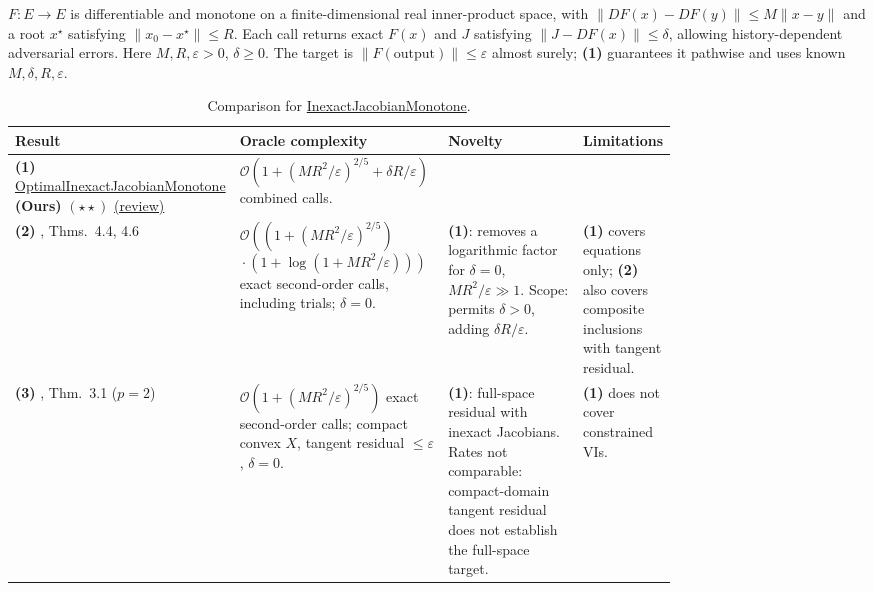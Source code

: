 \begin{table}[tp]
\centering
\caption{Comparison for \href{https://github.com/k3nfalt/longtails/blob/main/LongTails/Setups/InexactJacobianMonotone.lean}{InexactJacobianMonotone}.}\label{tab:InexactJacobianMonotone}
\parbox{\linewidth}{\footnotesize $F:E\to E$ is differentiable and monotone on a finite-dimensional real inner-product space, with $\|DF(x)-DF(y)\|\le M\|x-y\|$ and a root $x^\star$ satisfying $\|x_0-x^\star\|\le R$. Each call returns exact $F(x)$ and $J$ satisfying $\|J-DF(x)\|\le\delta$, allowing history-dependent adversarial errors. Here $M,R,\varepsilon>0$, $\delta\ge0$. The target is $\|F(\mathrm{output})\|\le\varepsilon$ almost surely; \textbf{(1)} guarantees it pathwise and uses known $M,\delta,R,\varepsilon$.}\par\smallskip
\begin{threeparttable}
\footnotesize
\setlength{\tabcolsep}{4pt}\renewcommand{\arraystretch}{1.25}
\begin{tabularx}{\linewidth}{@{}>{\raggedright\arraybackslash}p{0.20\linewidth}>{\raggedright\arraybackslash}p{0.32\linewidth}>{\raggedright\arraybackslash}p{0.25\linewidth}>{\raggedright\arraybackslash}X@{}}
\toprule
\textbf{Result} & \textbf{Oracle complexity} & \textbf{Novelty} & \textbf{Limitations} \\
\midrule
\textbf{(1)} \href{https://github.com/k3nfalt/longtails/blob/main/LongTails/Theorems/OptimalInexactJacobianMonotone.lean}{Optimal\allowbreak Inexact\allowbreak Jacobian\allowbreak Monotone} \textbf{(Ours)} $(\star\star)$ \href{https://github.com/k3nfalt/longtails/blob/main/scripts/reviews/OptimalInexactJacobianMonotone.md}{(review)} & $\mathcal{O}(1+(MR^2/\varepsilon)^{2/5}+\delta R/\varepsilon)$ combined calls. & & \\
\midrule[1.2pt]
\textbf{(2)} \citep{uljmJiangYoon2026v1}, Thms.~4.4, 4.6 & $\mathcal{O}\!\left((1+(MR^2/\varepsilon)^{2/5})\right.$\newline $\left.{}\cdot(1+\log(1+MR^2/\varepsilon))\right)$ exact second-order calls, including trials; $\delta=0$. & \textbf{(1)}: removes a logarithmic factor for $\delta=0$, $MR^2/\varepsilon\gg1$. Scope: permits $\delta>0$, adding $\delta R/\varepsilon$. & \textbf{(1)} covers equations only; \textbf{(2)} also covers composite inclusions with tangent residual. \\
\midrule
\textbf{(3)} \citep{uljmZhang2026v1}, Thm.~3.1 ($p=2$) & $\mathcal{O}(1+(MR^2/\varepsilon)^{2/5})$ exact second-order calls; compact convex $X$, tangent residual $\le\varepsilon$, $\delta=0$. & \textbf{(1)}: full-space residual with inexact Jacobians. Rates not comparable: compact-domain tangent residual does not establish the full-space target. & \textbf{(1)} does not cover constrained VIs. \\

\end{tabularx}
\end{threeparttable}
\end{table}
